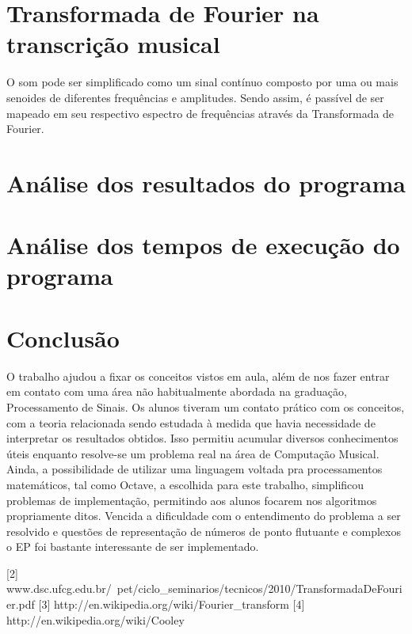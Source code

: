 \documentclass[brazil,times]{abnt}
\begin{document}
\section*{Transformada de Fourier na transcrição musical}
	O som pode ser simplificado como um sinal contínuo composto por uma ou mais senoides de diferentes frequências e amplitudes. Sendo assim, é passível de ser mapeado em seu respectivo espectro de frequências através da Transformada de Fourier.




\section*{Análise dos resultados do programa}

\section*{Análise dos tempos de execução do programa}



\section*{Conclusão}
	O trabalho ajudou a fixar os conceitos vistos em aula, além de nos fazer entrar em contato com uma área não habitualmente abordada na graduação, Processamento de Sinais. Os alunos tiveram um contato prático com os conceitos, com a teoria relacionada sendo estudada à medida que havia necessidade de interpretar os resultados obtidos. Isso permitiu acumular diversos conhecimentos úteis enquanto resolve-se um problema real na área de Computação Musical. Ainda, a possibilidade de utilizar uma linguagem voltada pra processamentos matemáticos, tal como Octave, a escolhida para este trabalho, simplificou problemas de implementação, permitindo aos alunos focarem nos algoritmos propriamente ditos. Vencida a dificuldade com o entendimento do problema a ser resolvido e questões de representação de números de ponto flutuante e complexos o EP foi bastante interessante de ser implementado.
	
[2] www.dsc.ufcg.edu.br/~pet/ciclo_seminarios/tecnicos/2010/TransformadaDeFourier.pdf
[3] http://en.wikipedia.org/wiki/Fourier_transform
[4] http://en.wikipedia.org/wiki/Cooley%
%
%
\end{document}
